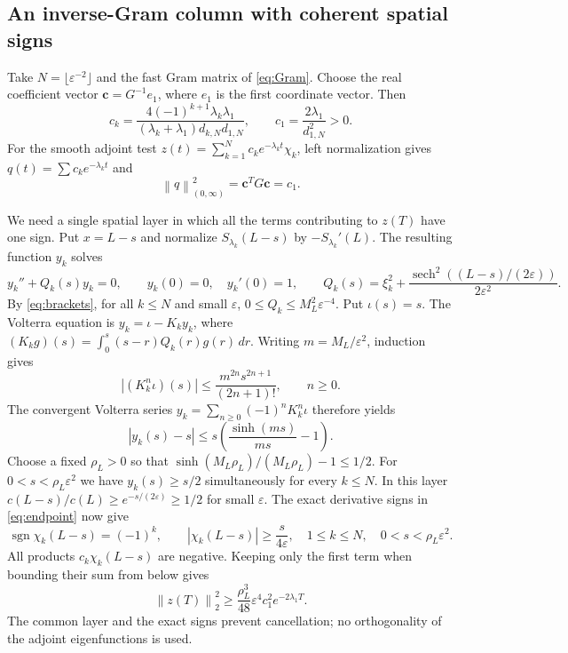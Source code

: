 \documentclass[11pt]{article}
\numberwithin{equation}{section}
\newcommand{\eps}{\varepsilon}
\newcommand{\sech}{\operatorname{sech}}
\newcommand{\norm}[1]{\left\|#1\right\|}
\begin{document}
\subsection{An inverse-Gram column with coherent spatial signs}

Take $N=\lfloor\eps^{-2}\rfloor$ and the fast Gram matrix of
\eqref{eq:Gram}. Choose the real coefficient vector $\boldsymbol c=G^{-1}e_1$,
where $e_1$ is the first coordinate vector. Then
\begin{equation}\label{eq:column}
 c_k=\frac{4(-1)^{k+1}\lambda_k\lambda_1}
 {(\lambda_k+\lambda_1)d_{k,N}d_{1,N}},\qquad
 c_1=\frac{2\lambda_1}{d_{1,N}^2}>0.
\end{equation}
For the smooth adjoint test
$z(t)=\sum_{k=1}^Nc_ke^{-\lambda_kt}\chi_k$,
left normalization gives $q(t)=\sum c_ke^{-\lambda_kt}$ and
\begin{equation}\label{eq:column-norm}
 \norm q_{(0,\infty)}^2=\boldsymbol c^TG\boldsymbol c=c_1.
\end{equation}

We need a single spatial layer in which all the terms contributing to
$z(T)$ have one sign. Put $x=L-s$ and normalize
$S_{\lambda_k}(L-s)$ by $-S_{\lambda_k}'(L)$.
The resulting function $y_k$ solves
\[
 y_k''+Q_k(s)y_k=0,\qquad y_k(0)=0,\quad y_k'(0)=1,\qquad
 Q_k(s)=\xi_k^2+\frac{\sech^2((L-s)/(2\eps))}{2\eps^2}.
\]
By \eqref{eq:brackets}, for all $k\le N$ and small $\eps$,
$0\le Q_k\le M_L^2\eps^{-4}$.
Put $\iota(s)=s$. The Volterra equation is $y_k=\iota-K_ky_k$, where
$(K_kg)(s)=\int_0^s(s-r)Q_k(r)g(r)\,dr$.
Writing $m=M_L/\eps^2$, induction gives
\[
 |(K_k^n\iota)(s)|\le\frac{m^{2n}s^{2n+1}}{(2n+1)!},\qquad n\ge0.
\]
The convergent Volterra series
$y_k=\sum_{n\ge0}(-1)^nK_k^n\iota$ therefore yields
\[
 |y_k(s)-s|\le s\left(\frac{\sinh(ms)}{ms}-1\right).
\]
Choose a fixed $\rho_L>0$ so that
$\sinh(M_L\rho_L)/(M_L\rho_L)-1\le1/2$.
For $0<s<\rho_L\eps^2$ we have $y_k(s)\ge s/2$
simultaneously for every $k\le N$.
In this layer
$c(L-s)/c(L)\ge e^{-s/(2\eps)}\ge1/2$ for small $\eps$.
The exact derivative signs in \eqref{eq:endpoint} now give
\begin{equation}\label{eq:layer}
 \operatorname{sgn}\chi_k(L-s)=(-1)^k,\qquad
 |\chi_k(L-s)|\ge\frac{s}{4\eps},
 \quad 1\le k\le N,\quad 0<s<\rho_L\eps^2.
\end{equation}
All products $c_k\chi_k(L-s)$ are negative.
Keeping only the first term when bounding their sum from below gives
\begin{equation}\label{eq:spatial-lower}
 \norm{z(T)}_2^2
 \ge\frac{\rho_L^3}{48}\eps^4c_1^2e^{-2\lambda_1T}.
\end{equation}
The common layer and the exact signs prevent cancellation; no
orthogonality of the adjoint eigenfunctions is used.
\end{document}
